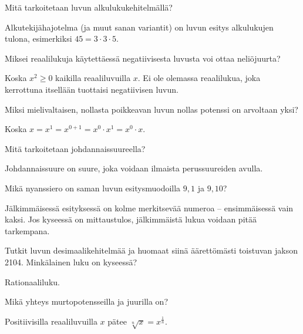 \begin{tehtava}
Mitä tarkoitetaan luvun alkulukukehitelmällä?
\begin{vastaus}
Alkutekijähajotelma (ja muut sanan variantit) on luvun esitys alkulukujen tulona, esimerkiksi $45=3\cdot 3 \cdot 5$.
\end{vastaus} %
\end{tehtava}

\begin{tehtava}
Miksei reaalilukuja käytettäessä negatiivisesta luvusta voi ottaa neliöjuurta?
\begin{vastaus}
Koska $x^2 \geq 0$ kaikilla reaaliluvuilla $x$. Ei ole olemassa reaalilukua, joka kerrottuna itsellään tuottaisi negatiivisen luvun.
\end{vastaus}
\end{tehtava}

\begin{tehtava}
Miksi mielivaltaisen, nollasta poikkeavan luvun nollas potenssi on arvoltaan yksi?
\begin{vastaus}
Koska $x=x^1=x^{0+1}=x^0 \cdot x^1 = x^0 \cdot x$.
\end{vastaus}
\end{tehtava}

\begin{tehtava}
Mitä tarkoitetaan johdannaissuureella?
\begin{vastaus}
Johdannaissuure on suure, joka voidaan ilmaista perussuureiden avulla.
\end{vastaus}
\end{tehtava}

\begin{tehtava}
Mikä nyanssiero on saman luvun esitysmuodoilla $9,1$ ja $9,10$?
\begin{vastaus}
Jälkimmäisessä esityksessä on kolme merkitsevää numeroa -- ensimmäisessä vain kaksi. Jos kyseessä on mittaustulos, jälkimmäistä lukua voidaan pitää tarkempana.
\end{vastaus}
\end{tehtava}

\begin{tehtava}
Tutkit luvun desimaalikehitelmää ja huomaat siinä äärettömästi toistuvan jakson 2104. Minkälainen luku on kyseessä?
\begin{vastaus}
Rationaaliluku.
\end{vastaus}
\end{tehtava}

\begin{tehtava}
Mikä yhteys murtopotensseilla ja juurilla on?
\begin{vastaus}
Positiivisilla reaaliluvuilla $x$ pätee $\sqrt[n]{x} = x^{\frac{1}{n}}$.
\end{vastaus}
\end{tehtava}

